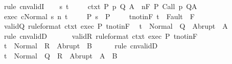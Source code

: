 \begin{isabellebody}
%
\isadelimproof
%
\endisadelimproof
%
\isatagproof
{}\isamarkupfalse%
\ {\isacharparenleft}rule\ cnvalidI{\isacharparenright}\isanewline
\ \ \isamarkupfalse%
\ s\ t\ \isanewline
\ \ \isamarkupfalse%
\ ctxt{\isacharcolon}\ {\isachardoublequoteopen}{\isasymforall}{\isacharparenleft}P{\isacharcomma}\ p{\isacharcomma}\ Q{\isacharcomma}\ A{\isacharparenright}{\isasymin}{\isasymTheta}{\isachardot}\ {\isasymGamma}\ {\isasymTurnstile}n{\isacharcolon}\isactrlbsub {\isacharslash}F\isactrlesub \ P\ {\isacharparenleft}Call\ p{\isacharparenright}\ Q{\isacharcomma}A{\isachardoublequoteclose}\ \isanewline
\ \ \isamarkupfalse%
\ exec{\isacharcolon}\ {\isachardoublequoteopen}{\isasymGamma}{\isasymturnstile}{\isasymlangle}c{\isacharcomma}Normal\ s{\isasymrangle}\ {\isacharequal}n{\isasymRightarrow}\ t{\isachardoublequoteclose}\ \isanewline
\ \ \isamarkupfalse%
\ P{\isacharcolon}\ {\isachardoublequoteopen}s\ {\isasymin}\ P{\isachardoublequoteclose}\ \isanewline
\ \ \isamarkupfalse%
\ t{\isacharunderscore}notin{\isacharunderscore}F{\isacharcolon}\ {\isachardoublequoteopen}t\ {\isasymnotin}\ Fault\ {\isacharbackquote}\ F{\isachardoublequoteclose}\isanewline
\ \ \isamarkupfalse%
\ valid{\isacharunderscore}Q\ {\isacharbrackleft}rule{\isacharunderscore}format{\isacharbrackright}\ ctxt\ exec\ P\ t{\isacharunderscore}notin{\isacharunderscore}F\ \isamarkupfalse%
\ {\isachardoublequoteopen}t\ {\isasymin}\ Normal\ {\isacharbackquote}\ Q\ {\isasymunion}\ Abrupt\ {\isacharbackquote}\ A{\isachardoublequoteclose}\isanewline
\ \ \ \ \isamarkupfalse%
\ {\isacharparenleft}rule\ cnvalidD{\isacharparenright}\isanewline
\ \ \isamarkupfalse%
\isanewline
\ \ \isamarkupfalse%
\ valid{\isacharunderscore}R\ {\isacharbrackleft}rule{\isacharunderscore}format{\isacharbrackright}\ ctxt\ exec\ P\ t{\isacharunderscore}notin{\isacharunderscore}F\ \isamarkupfalse%
\ {\isachardoublequoteopen}t\ {\isasymin}\ Normal\ {\isacharbackquote}\ R\ {\isasymunion}\ Abrupt\ {\isacharbackquote}\ B{\isachardoublequoteclose}\isanewline
\ \ \ \ \isamarkupfalse%
\ {\isacharparenleft}rule\ cnvalidD{\isacharparenright}\isanewline
\ \ \isamarkupfalse%
\ \isamarkupfalse%
\ {\isachardoublequoteopen}t\ {\isasymin}\ Normal\ {\isacharbackquote}\ {\isacharparenleft}Q\ {\isasyminter}\ R{\isacharparenright}\ {\isasymunion}\ Abrupt\ {\isacharbackquote}\ {\isacharparenleft}A\ {\isasyminter}\ B{\isacharparenright}{\isachardoublequoteclose}\isanewline

\end{isabellebody}
